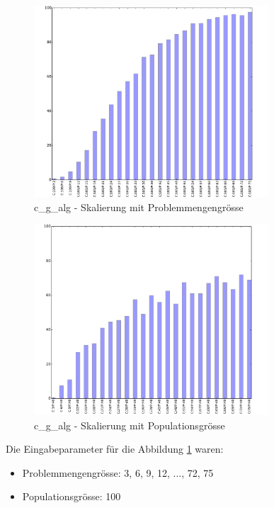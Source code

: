 \begin{figure}[ht]
  \centering
  \includegraphics[width=0.78\textwidth]{images/C_G_PS_div5PS_solved.pdf}
  \caption[\Gls{c_g_alg} - Skalierung mit Problemmengengrösse]{\Gls{c_g_alg} - Skalierung mit Problemmengengrösse}
  \label{fig:c_g_ps_div5}
\end{figure}

\begin{figure}[H]
  \centering
  \includegraphics[width=0.78\textwidth]{images/C_G_CS_div5CS_solved.pdf}
  \caption[\Gls{c_g_alg} - Skalierung mit Populationsgrösse]{\Gls{c_g_alg} - Skalierung mit Populationsgrösse}
  \label{fig:c_g_cs_div5}
\end{figure}

Die Eingabeparameter für die Abbildung \ref{fig:c_g_ps_div5} waren:
\begin{itemize}
	\item Problemmengengrösse: 3, 6, 9, 12, ..., 72, 75
	\item Populationsgrösse: 100
\end{itemize}

